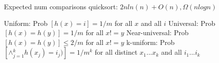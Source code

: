 \begin{algorithmic}[1]
		\EndFor
		\Else
		\EndIf
	\EndFunction
\end{algorithmic}

Expected num comparisons  quicksort: $2nln(n) + O(n), \Omega(nlogn)$


Uniform: Prob $[h(x) = i] = 1/m$ for all $x$ and all $i$
Universal: Prob $[h(x) = h(y)] = 1/m$ for all $x != y$
Near-universal: Prob $[h(x) = h(y)] \leq 2/m$ for all $x != y$
k-uniform: Prob $ [ \wedge{}_{j=1}^{k} h(x_j) = i_j) ] = 1 / m^{k}$ for all distinct $x_1...x_k$ and all $i_1...i_k$